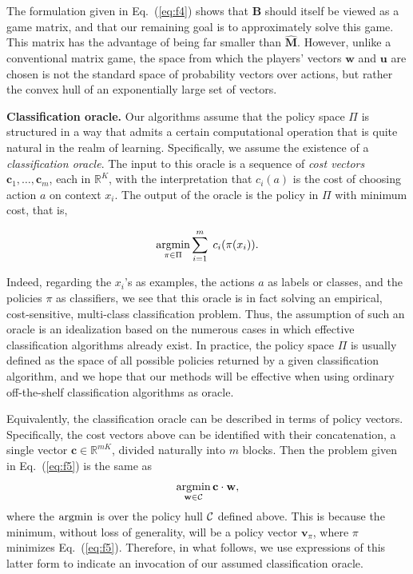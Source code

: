 The formulation given in Eq.~(\ref{eq:f4}) shows that $\mathbf{B}$ should itself be viewed as a game matrix, and that our remaining goal is to approximately solve this game. This matrix has the advantage of being far smaller than $\mathbf{\hat{M}}$.
However, unlike a conventional matrix game, the space from which the players' vectors $\mathbf{w}$ and $\mathbf{u}$ are chosen is not the standard space of probability vectors over actions, but rather the convex hull of an exponentially large set of vectors.

 {\bf Classification oracle.} Our algorithms assume that the policy space $\Pi$ is structured in a way that admits a certain computational operation that is quite natural in the realm of learning. Specifically, we assume the existence of a {\em classification oracle}. The input to this oracle is a sequence of {\em cost vectors}
$\mathbf{c}_1,\ldots,\mathbf{c}_m$, each in ${\mathbb{R}}^K$,
with the interpretation that ${c}_i(a)$ is the cost of choosing action $a$ on context $x_i$. The output of the oracle is the policy in $\Pi$ with minimum cost, that is,

\begin{equation} \label{eq:f5}
  \operatornamewithlimits{argmin}_{\pi\in\Pi} 
          \sum_{i=1}^{m}\; {c}_i(\pi(x_i)).
\end{equation}

Indeed, regarding the $x_i$'s as examples, the actions $a$ as labels or classes, and the policies $\pi$ as classifiers, we see that this oracle is in fact solving an empirical, cost-sensitive, multi-class classification problem. Thus, the assumption of such an oracle is an idealization based on the numerous cases in which effective classification algorithms already exist. In practice, the policy space $\Pi$ is usually defined as the space of all possible policies returned by a given classification algorithm, and we hope that our methods will be effective when using ordinary off-the-shelf classification algorithms as oracle.

Equivalently, the classification oracle can be described in terms of policy vectors. Specifically, the cost vectors above can be identified with their concatenation, a single vector $\mathbf{c}\in{\mathbb{R}}^{m K}$, divided naturally into $m$ blocks. Then the problem given in Eq.~(\ref{eq:f5}) is the same as
\[
  \operatornamewithlimits{argmin}_{\mathbf{w}\in{\cal C}} \mathbf{c}\cdot\mathbf{w},
\]
where the $\operatornamewithlimits{argmin}$ is over the policy hull ${\cal C}$ defined above. This is because the minimum, without loss of generality, will be a policy vector $\mathbf{v}_\pi$, where $\pi$ minimizes Eq.~(\ref{eq:f5}).
Therefore, in what follows, we use expressions of this latter form to indicate an invocation of our assumed classification oracle.


